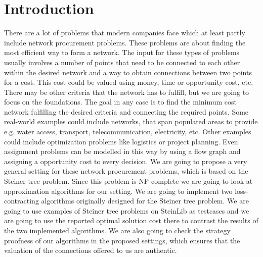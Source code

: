 
\chapter{Introduction}\label{chapter:introduction}

There are a lot of problems that modern companies face which at least partly include network procurement problems. These problems are about finding the most efficient way to form a network. The input for these types of problems usually involves a number of points that need to be connected to each other within the desired network and a way to obtain connections between two points for a cost. This cost could be valued using money, time or opportunity cost, etc. There may be other criteria that the network has to fulfill, but we are going to focus on the foundations. The goal in any case is to find the minimum cost network fulfilling the desired criteria and connecting the required points. 
Some real-world examples could include networks, that span populated areas to provide e.g. water access, transport, telecommunication, electricity, etc. Other examples could include optimization problems like logistics or project planning. Even assignment problems can be modelled in this way by using a flow graph and assigning a opportunity cost to every decision. 
We are going to propose a very general setting for these network procurement problems, which is based on the Steiner tree problem. Since this problem is NP-complete we are going to look at approximation algorithms for our setting. We are going to implement two loss-contracting algorithms originally designed for the Steiner tree problem. We are going to use examples of Steiner tree problems on SteinLib \cite{Dui93} as testcases and we are going to use the reported optimal solution cost there to contrast the results of the two implemented algorithms. We are also going to check the strategy proofness of our algorithms in the proposed settings, which ensures that the valuation of the connections offered to us are authentic.  